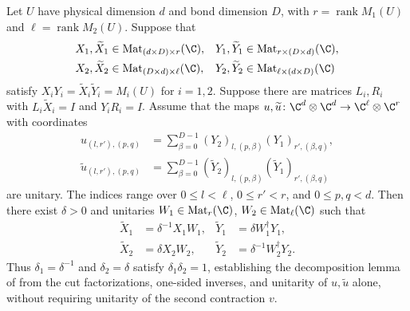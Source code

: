 \begin{lemma}
    \label{thm:mpug_source_decomposition_gauges}
    \leanok
    Let $U$ have physical dimension $d$ and bond dimension $D$, with
    $r=\operatorname{rank}M_1(U)$ and $\ell=\operatorname{rank}M_2(U)$.
    Suppose that
    \begin{align}
        X_1,\widetilde X_1 & \in\operatorname{Mat}_{(d\times D)\times r}(\C),   &
        Y_1,\widetilde Y_1 & \in\operatorname{Mat}_{r\times(D\times d)}(\C),      \\
        X_2,\widetilde X_2 & \in\operatorname{Mat}_{(D\times d)\times\ell}(\C), &
        Y_2,\widetilde Y_2 & \in\operatorname{Mat}_{\ell\times(d\times D)}(\C)
    \end{align}
    satisfy $X_iY_i=\widetilde X_i\widetilde Y_i=M_i(U)$ for $i=1,2$.
    Suppose there are matrices $L_i,R_i$ with
    $L_i\widetilde X_i=I$ and $Y_iR_i=I$.
    Assume that the maps $u,\widetilde u\colon\C^d\otimes\C^d\to
        \C^\ell\otimes\C^r$ with coordinates
    \begin{align}
        u_{(l,r'),(p,q)}
         & =\sum_{\beta=0}^{D-1}(Y_2)_{l,(p,\beta)}(Y_1)_{r',(\beta,q)}, \\
        \widetilde u_{(l,r'),(p,q)}
         & =\sum_{\beta=0}^{D-1}(\widetilde Y_2)_{l,(p,\beta)}
        (\widetilde Y_1)_{r',(\beta,q)}
    \end{align}
    are unitary. The indices range over $0\leq l<\ell$, $0\leq r'<r$,
    and $0\leq p,q<d$. Then there exist $\delta>0$ and unitaries
    $W_1\in\operatorname{Mat}_r(\C)$, $W_2\in\operatorname{Mat}_\ell(\C)$ such that
    \begin{align}
        \widetilde X_1 & =\delta^{-1}X_1W_1,          &
        \widetilde Y_1 & =\delta W_1^\dagger Y_1,       \\
        \widetilde X_2 & =\delta X_2W_2,              &
        \widetilde Y_2 & =\delta^{-1}W_2^\dagger Y_2.
        \label{eq:mpug_source_decomposition_gauges}
    \end{align}
    Thus $\delta_1=\delta^{-1}$ and $\delta_2=\delta$ satisfy
    $\delta_1\delta_2=1$, establishing the decomposition lemma of
    \cite[lines~1052--1066]{FrancoRubio2025MPUGauging} from the cut factorizations,
    one-sided inverses, and unitarity of $u,\widetilde u$ alone, without requiring
    unitarity of the second contraction $v$.
\end{lemma}

